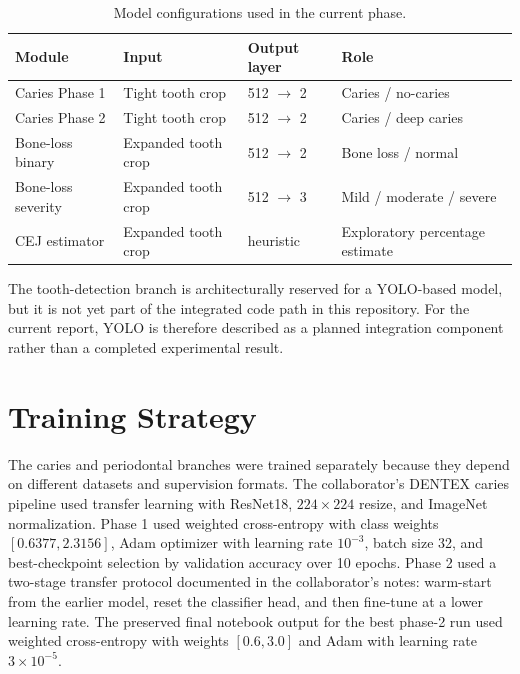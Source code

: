 \begin{table}[htbp]
  \centering
  \caption{Model configurations used in the current phase.}
  \label{tab:model-configs}
  \begin{tabular}{@{}llll@{}}
    \toprule
    Module & Input & Output layer & Role \\
    \midrule
    Caries Phase 1 & Tight tooth crop & 512 \(\rightarrow\) 2 & Caries / no-caries \\
    Caries Phase 2 & Tight tooth crop & 512 \(\rightarrow\) 2 & Caries / deep caries \\
    Bone-loss binary & Expanded tooth crop & 512 \(\rightarrow\) 2 & Bone loss / normal \\
    Bone-loss severity & Expanded tooth crop & 512 \(\rightarrow\) 3 & Mild / moderate / severe \\
    CEJ estimator & Expanded tooth crop & heuristic & Exploratory percentage estimate \\
    \bottomrule
  \end{tabular}
\end{table}

The tooth-detection branch is architecturally reserved for a YOLO-based model,
but it is not yet part of the integrated code path in this repository. For the
current report, YOLO is therefore described as a planned integration component
rather than a completed experimental result.

\section{Training Strategy}
\label{sec:method-training}

The caries and periodontal branches were trained separately because they depend
on different datasets and supervision formats. The collaborator's DENTEX caries
pipeline used transfer learning with ResNet18, \(224 \times 224\) resize, and
ImageNet normalization. Phase 1 used weighted cross-entropy with class weights
\([0.6377, 2.3156]\), Adam optimizer with learning rate \(10^{-3}\), batch size
32, and best-checkpoint selection by validation accuracy over 10 epochs. Phase
2 used a two-stage transfer protocol documented in the collaborator's notes:
warm-start from the earlier model, reset the classifier head, and then
fine-tune at a lower learning rate. The preserved final notebook output for the
best phase-2 run used weighted cross-entropy with weights \([0.6, 3.0]\) and
Adam with learning rate \(3 \times 10^{-5}\).

